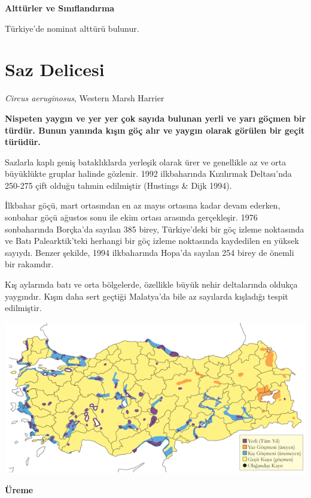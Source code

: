 \documentclass[
  letterpaper,
  DIV=11,
  numbers=noendperiod]{scrreprt}
\begin{document}
\textbf{Alttürler ve Sınıflandırma}

Türkiye'de nominat alttürü bulunur.

\section{Saz Delicesi}\label{saz-delicesi}

\emph{Circus aeruginosus}, Western Marsh Harrier

\textbf{Nispeten yaygın ve yer yer çok sayıda bulunan yerli ve yarı
göçmen bir türdür. Bunun yanında kışın göç alır ve yaygın olarak görülen
bir geçit türüdür.}

Sazlarla kaplı geniş bataklıklarda yerleşik olarak ürer ve genellikle az
ve orta büyüklükte gruplar halinde gözlenir. 1992 ilkbaharında
Kızılırmak Deltası'nda 250-275 çift olduğu tahmin edilmiştir (Hustings
\& Dijk 1994).

İlkbahar göçü, mart ortasından en az mayıs ortasına kadar devam ederken,
sonbahar göçü ağustos sonu ile ekim ortası arasında gerçekleşir. 1976
sonbaharında Borçka'da sayılan 385 birey, Türkiye'deki bir göç izleme
noktasında ve Batı Palearktik'teki herhangi bir göç izleme noktasında
kaydedilen en yüksek sayıydı. Benzer şekilde, 1994 ilkbaharında Hopa'da
sayılan 254 birey de önemli bir rakamdır.

Kış aylarında batı ve orta bölgelerde, özellikle büyük nehir
deltalarında oldukça yaygındır. Kışın daha sert geçtiği Malatya'da bile
az sayılarda kışladığı tespit edilmiştir.

\includegraphics{images/harita_Page_102.png}

\textbf{Üreme}
\end{document}
